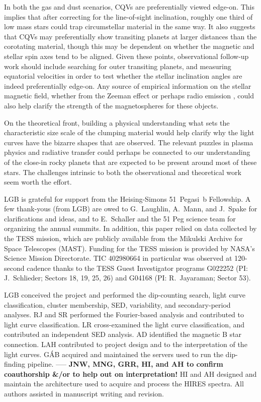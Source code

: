 \documentclass[11pt,twocolumn,tighten]{aastex63}
\begin{document}
In both the gas and dust scenarios, CQVs are preferentially viewed
edge-on.  This implies that after correcting for the line-of-sight
inclination, roughly one third of low mass stars \citep[those that
rotate rapidly enough][]{2022AJ....163..144G} could trap circumstellar
material in the same way.  It also suggests that CQVs may
preferentially show transiting planets at larger distances than the
corotating material, though this may be dependent on whether the
magnetic and stellar spin axes tend to be aligned.  Given these
points, observational follow-up work should include searching for
outer transiting planets, and measuring equatorial velocities in order
to test whether the stellar inclination angles are indeed
preferentially edge-on.  Any source of empirical information on the
stellar magnetic field, whether from the Zeeman effect
\citep[e.g.][]{2021A&ARv..29....1K} or perhaps radio emission
\citep[e.g.][]{2015Natur.523..568H}, could also help clarify the
strength of the magnetospheres for these objects.

On the theoretical front, building a physical understanding what sets
the characteristic size scale of the clumping material would help
clarify why the light curves have the bizarre shapes that are
observed.  The relevant puzzles in plasma physics and radiative
transfer could perhaps be connected to our understanding of the
close-in rocky planets that are expected to be present around most of
these stars.  The challenges intrinsic to both the observational and
theoretical work seem worth the effort.



\acknowledgments
LGB is grateful for support from the Heising-Simons 51~Pegasi~b
Fellowship.  A few thank-yous (from LGB) are owed to G.~Laughlin,
A.~Mann, and J.~Spake for clarifications and ideas, and to E.~Schaller
and the 51 Peg science team for organizing the annual summits.  In
addition, this paper relied on data collected by the TESS mission,
which are publicly available from the Mikulski Archive for Space
Telescopes (MAST).  Funding for the TESS mission is provided by NASA’s
Science Mission Directorate.  TIC 402980664 in particular was observed
at 120-second cadence thanks to the TESS Guest Investigator programs
G022252 (PI: J.~Schlieder; Sectors 18, 19, 25, 26) and G04168 (PI:
R.~Jayaraman; Sector 53).


LGB conceived the project and performed the dip-counting search, light curve classification, cluster membership, SED, variability, and secondary-period analyses.
RJ and SR performed the Fourier-based analysis and contributed to light curve classification.
LR cross-examined the light curve classification, and contributed an independent SED analysis.
AD identified the magnetic B star connection.
LAH contributed to project design and to the interpretation of the light curves.
G\'AB acquired and maintained the servers used to run the dip-finding pipeline.
-----
{\bf JNW, MNG, GRR, HI, and AH to confirm coauthorship \&/or to help out on interpretation!}
HI and AH designed and maintain the architecture used to acquire and process the HIRES spectra.
All authors assisted in manuscript writing and revision.
\end{document}
